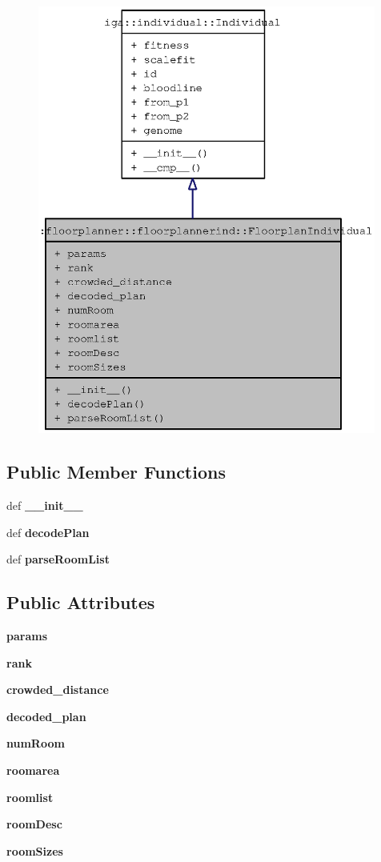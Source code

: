 \begin{figure}[H]
\begin{center}
\leavevmode
\includegraphics[height=400pt]{classapp_1_1floorplanner_1_1floorplannerind_1_1FloorplanIndividual__coll__graph}
\end{center}
\end{figure}
\subsection*{Public Member Functions}
\begin{CompactItemize}
\item 
def {\bf \_\-\_\-init\_\-\_\-}
\item 
def {\bf decodePlan}
\item 
def {\bf parseRoomList}
\end{CompactItemize}
\subsection*{Public Attributes}
\begin{CompactItemize}
\item 
{\bf params}
\item 
{\bf rank}
\item 
{\bf crowded\_\-distance}
\item 
{\bf decoded\_\-plan}
\item 
{\bf numRoom}
\item 
{\bf roomarea}
\item 
{\bf roomlist}
\item 
{\bf roomDesc}
\item 
{\bf roomSizes}
\end{CompactItemize}


